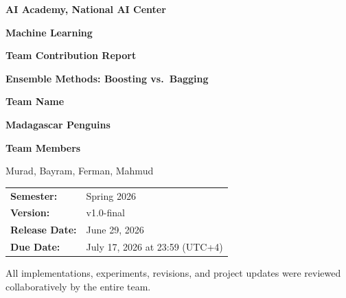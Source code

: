 \documentclass[11pt,a4paper]{article}
\newcommand{\coursename}{Machine Learning}
\newcommand{\institution}{AI Academy, National AI Center}
\newcommand{\semester}{Spring 2026}
\newcommand{\projecttitle}{Ensemble Methods: Boosting vs.\ Bagging}
\newcommand{\reporttitle}{Team Contribution Report}
\newcommand{\teamname}{Madagascar Penguins}
\newcommand{\teammembers}{Murad, Bayram, Ferman, Mahmud}
\newcommand{\releasedate}{June 29, 2026}
\newcommand{\duedate}{July 17, 2026 at 23:59 (UTC+4)}
\newcommand{\version}{v1.0-final}
\begin{document}


\begin{center}

{\Large\bfseries\color{accent} \institution}

\vspace{0.2cm}

{\large\bfseries \coursename}

\vspace{0.45cm}

{\Huge\bfseries\color{accent} \reporttitle}

\vspace{0.25cm}

{\LARGE\bfseries \projecttitle}

\vspace{0.55cm}

\begin{teaminfo}
\centering

{\large\textbf{Team Name}}

\vspace{0.1cm}

{\LARGE\bfseries\color{accentdark} \teamname}

\vspace{0.4cm}

{\large\textbf{Team Members}}

\vspace{0.1cm}

{\large \teammembers}

\end{teaminfo}

\vspace{0.4cm}

\begin{tabular}{>{\bfseries}l l}
Semester: & \semester \\
Version: & \version \\
Release Date: & \releasedate \\
Due Date: & \duedate
\end{tabular}

\end{center}

\vspace{0.45cm}

\begin{infobox}
All implementations, experiments, revisions, and project updates were
reviewed collaboratively by the entire team.
\end{infobox}
\end{document}
